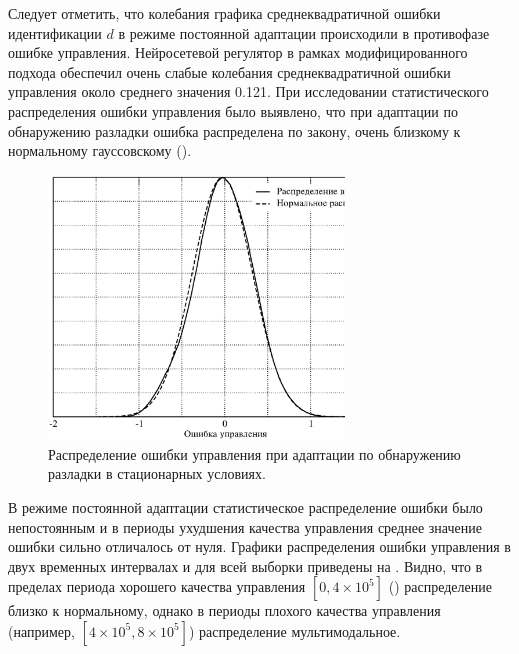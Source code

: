 Следует отметить, что колебания графика среднеквадратичной ошибки
идентификации $d$ в режиме постоянной адаптации происходили в
противофазе ошибке управления.  Нейросетевой регулятор в рамках
модифицированного подхода обеспечил очень слабые колебания
среднеквадратичной ошибки управления около среднего значения 0.121.
При исследовании статистического распределения ошибки управления было
выявлено, что при адаптации по обнаружению разладки ошибка
распределена по закону, очень близкому к нормальному гауссовскому
().

\begin{figure}[h]
\centering
\includegraphics[width=0.7\textwidth,%
  totalheight=0.3\textheight]{modif_apr_distrib_rus}
\caption{Распределение ошибки управления при адаптации по обнаружению
  разладки в стационарных условиях.}
\label{fig:modif_apr_distrib_rus}
\end{figure}

В режиме постоянной адаптации статистическое распределение ошибки было
непостоянным и в периоды ухудшения качества управления среднее
значение ошибки сильно отличалось от нуля.  Графики распределения
ошибки управления в двух временных интервалах и для всей выборки
приведены на .  Видно, что в
пределах периода хорошего качества управления $[0, 4\times10^5]$
() распределение близко к нормальному,
однако в периоды плохого качества управления (например, $[4\times10^5,
  8\times10^5]$) распределение мультимодальное.


